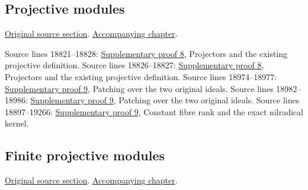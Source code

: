 \subsection{Projective modules}
\hypertarget{algebra-source-section-projective}{}
\noindent\href{https://github.com/stacks/stacks-project/blob/a04446e57ec1fbc252a871afcec7752fb2807b14/algebra.tex\#L18774}{Original source section}. \href{algebra.pdf\#nameddest=section-projective}{Accompanying chapter}.

\begin{AlgebraSourceRoutes}
 Source lines 18821--18828: \hyperlink{algebra_depth_tor_projective_notes_20260927}{Supplementary proof 8}, Projectors and the existing projective definition.
 Source lines 18826--18827: \hyperlink{algebra_depth_tor_projective_notes_20260927}{Supplementary proof 8}, Projectors and the existing projective definition.
 Source lines 18974--18977: \hyperlink{algebra_projective_lifting_notes_20260927}{Supplementary proof 9}, Patching over the two original ideals.
 Source lines 18982--18986: \hyperlink{algebra_projective_lifting_notes_20260927}{Supplementary proof 9}, Patching over the two original ideals.
 Source lines 18897--19266: \hyperlink{algebra_projective_lifting_notes_20260927}{Supplementary proof 9}, Constant fibre rank and the exact nilradical kernel.
\end{AlgebraSourceRoutes}

\subsection{Finite projective modules}
\hypertarget{algebra-source-section-finite-projective-modules}{}
\noindent\href{https://github.com/stacks/stacks-project/blob/a04446e57ec1fbc252a871afcec7752fb2807b14/algebra.tex\#L19000}{Original source section}. \href{algebra.pdf\#nameddest=section-finite-projective-modules}{Accompanying chapter}.

